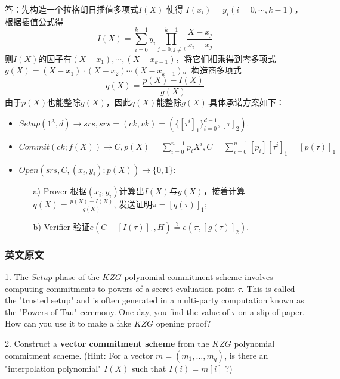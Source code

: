 \documentclass[10pt]{ctexart}
\begin{document}
\begin{enumerate}
    答：先构造一个拉格朗日插值多项式$I(X)$ 使得 $I\left(x_{i}\right)=y_{i}(i=0,\cdots, k-1)$，根据插值公式得
    $$
    I(X)=\sum_{i=0}^{k-1}y_i \prod_{j=0,j\neq i}^{k-1}\frac{X-x_j}{x_i-x_j}
    $$
    则$I(X)$的因子有$(X-x_1), \cdots, (X-x_{k-1})$，将它们相乘得到零多项式$g(X)=(X-x_1)\cdot (X-x_2) \cdots (X-x_{k-1})$。构造商多项式
    $$
    q(X)=\frac{p(X)-I(X)}{g(X)}
    $$
    由于$p(X)$也能整除$g(X)$，因此$q(X)$能整除$g(X)$.具体承诺方案如下：
    \begin{itemize}
        \item $Setup(1^\lambda,d) \rightarrow srs, srs =(ck,vk)=(\{[\tau^i]_1\}_{i=0}^{d-1},[\tau]_2)$.
        \item $Commit(ck;f(X)) \rightarrow C, p(X) = \sum_{i=0}^{n-1}p_iX^i, C = \sum_{i=0}^{n-1}[p_i][\tau^i]_1=[p(\tau)]_1$
        \item $Open(srs,C,(x_i,y_i);p(X)) \rightarrow \{0,1\}$:
            \begin{enumerate}
                \item[a)] Prover 根据$(x_i,y_i)$计算出$I(X)$与$g(X)$，接着计算$q(X)=\frac{p(X)-I(X)}{g(X)}$, 发送证明$\pi = [q(\tau)]_1$;
                \item[b)] Verifier 验证$e(C-[I(\tau)]_1, H) \overset{\text{?}}{=} e(\pi,[g(\tau)]_2)$.
            \end{enumerate}
    \end{itemize}
\end{enumerate}

\subsubsection*{英文原文}

1. The $Setup$ phase of the $KZG$ polynomial commitment scheme involves computing commitments to powers of a secret evaluation point $\tau$. This is called the "trusted setup" and is often generated in a multi-party computation known as the "Powers of Tau" ceremony. One day, you find the value of $\tau$ on a slip of paper. How can you use it to make a fake $KZG$ opening proof?

2. Construct a \textbf{vector commitment scheme} from the $KZG$ polynomial commitment scheme. (Hint: For a vector $m=\left(m_{1}, \ldots, m_{q}\right)$, is there an "interpolation polynomial" $I(X)$ such that $I(i)=m[i]$ ?)

\begin{center}
\end{center}
\end{document}
